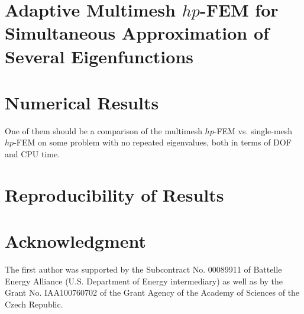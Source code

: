 \documentclass[preprint ,12pt]{elsarticle}
\begin{document}









\section{Adaptive Multimesh $hp$-FEM for Simultaneous Approximation of Several Eigenfunctions}


\section{Numerical Results}

One of them should be a comparison of the multimesh $hp$-FEM vs. single-mesh 
$hp$-FEM on some problem with no repeated eigenvalues, both in terms of DOF and 
CPU time.

\section{Reproducibility of Results} \label{sec:reproducibility}

\section*{Acknowledgment}

The first author was supported by the Subcontract No. 00089911 of Battelle Energy
Alliance (U.S. Department of Energy intermediary) as well as by the Grant No. 
IAA100760702 of the Grant Agency of the Academy of Sciences of the Czech Republic.


\clearpage
\end{document}
